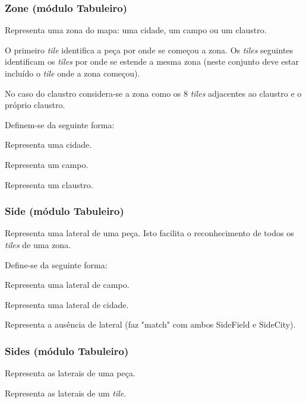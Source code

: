 \documentclass[11pt, a4paper, twoside]{article}
\begin{document}
\subsubsection[Zone]{Zone (módulo Tabuleiro)}

Representa uma zona do mapa: uma cidade, um campo ou um claustro.

O primeiro \textit{tile} identifica a peça por onde se começou a zona. Os \textit{tiles} seguintes identificam os \textit{tiles} por onde se estende a mesma zona (neste conjunto deve estar incluído o \textit{tile} onde a zona começou).

No caso do claustro considera-se a zona como os 8 \textit{tiles} adjacentes ao claustro e o próprio claustro.

Definem-se da seguinte forma:
\begin{description}[style=multiline,leftmargin=5cm,font=\bfseries]
    \item[City Tile [Tile{]}] Representa uma cidade.
    \item[Field Tile [Tile{]}] Representa um campo.
    \item[Cloister Tile [Tile{]}] Representa um claustro.
\end{description}

\subsubsection[Side]{Side (módulo Tabuleiro)}
Representa uma lateral de uma peça. Isto facilita o reconhecimento de todos os \textit{tiles} de uma zona.

Define-se da seguinte forma:
\begin{description}[style=multiline,leftmargin=3cm,font=\bfseries]
    \item[SideField] Representa uma lateral de campo.
    \item[SideCity] Representa uma lateral de cidade.
    \item[SideBoth] Representa a ausência de lateral (faz "match" com ambos SideField e SideCity).
\end{description}

\subsubsection[Sides]{Sides (módulo Tabuleiro)}

Representa as laterais de uma peça.

\begin{description}[style=multiline,leftmargin=5cm,font=\bfseries]
    \item[(Side, Side, Side, Side)] Representa as laterais de um \textit{tile}.
\end{description}
\end{document}
